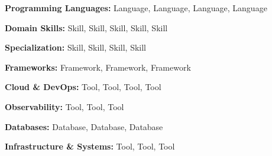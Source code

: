 \textbf{Programming Languages:} Language, Language, Language, Language\par
\textbf{Domain Skills:} Skill, Skill, Skill, Skill, Skill\par
\textbf{Specialization:} Skill, Skill, Skill, Skill\par
\textbf{Frameworks:} Framework, Framework, Framework\par
\textbf{Cloud \& DevOps:} Tool, Tool, Tool, Tool\par
\textbf{Observability:} Tool, Tool, Tool\par
\textbf{Databases:} Database, Database, Database\par
\textbf{Infrastructure \& Systems:} Tool, Tool, Tool
